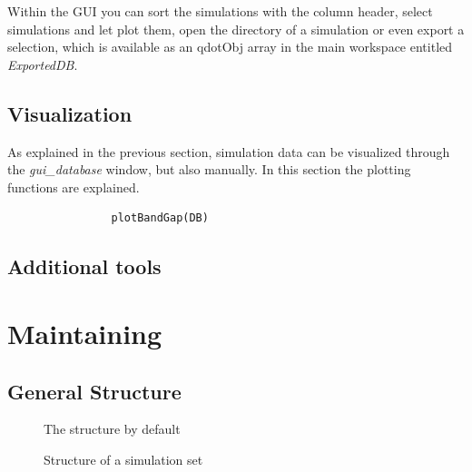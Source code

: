			Within the \gls{GUI} you can sort the simulations with the column header, select simulations and let plot them, open the directory of a simulation or 
			even export a selection, which is available as an qdotObj array in the main workspace entitled {\it ExportedDB}.


		\subsection{Visualization} \label{sec:Visualization}
			As explained in the previous section, simulation data can be visualized  through the {\it gui\_database} window, but also manually.
			In this section the plotting  functions are explained.
			
			\begin{lstlisting}
				plotBandGap(DB)
			\end{lstlisting}
		
		
		\subsection{Additional tools} \label{sec:addTools}
			
	
	\section{Maintaining \software}
		\subsection{General Structure} \label{sec:SoftwareStructure}
		
			\begin{figure}[htbp]
				\begin{minipage}[b]{0.59\textwidth}
				\caption{The \software structure by default}
				\label{dir:ToolboxTree}
			\end{minipage}
			\hfill
			\begin{minipage}[b]{0.39\textwidth}
			\caption{Structure of a simulation set}
			\label{dir:SimSetTree}
			\end{minipage}
			\end{figure}
			
